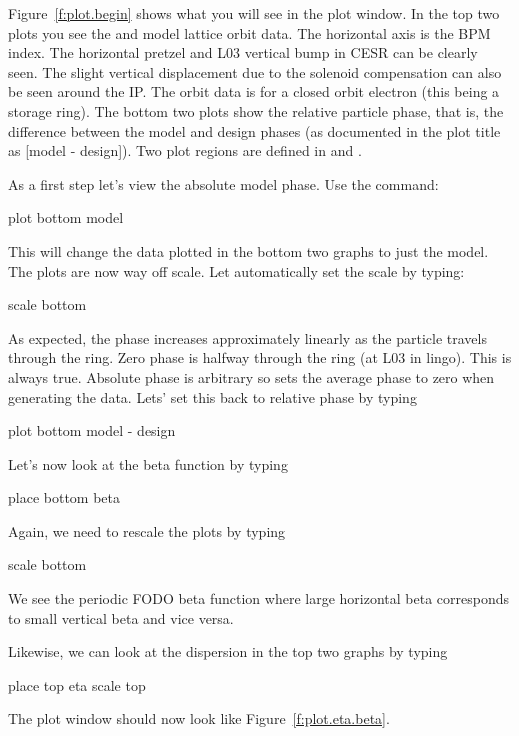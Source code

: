 Figure~\ref{f:plot.begin} shows what you will see in the plot
window. In the top two plots you see the  and  model
lattice orbit data. The horizontal axis is the \cesr BPM index. The
horizontal pretzel and L03 vertical bump in CESR can be clearly
seen. The slight vertical displacement due to the solenoid
compensation can also be seen around the IP. The orbit data is for a
closed orbit electron (this being a storage ring). The bottom two
plots show the relative particle phase, that is, the difference
between the model and design phases (as documented in the plot title
as [model - design]). Two plot regions are defined in \tao
{} and .

As a first step let's view the absolute model phase. Use the command:
\begin{example}
  plot bottom model
\end{example}
This will change the data plotted in the bottom two graphs to just the
model.  The plots are now way off scale. Let \tao automatically set
the scale by typing:
\begin{example}
  scale bottom
\end{example}
As expected, the phase increases approximately linearly as the
particle travels through the ring. Zero phase is halfway through the
ring (at L03 in \cesr lingo).  This is always true. Absolute phase is
arbitrary so \tao sets the average phase to zero when generating the
data. Lets' set this back to relative phase by typing
\begin{example}
  plot bottom model - design
\end{example}

Let's now look at the beta function by typing
\begin{example}
  place bottom beta
\end{example}
Again, we need to rescale the plots by typing
\begin{example}
  scale bottom
\end{example}
We see the periodic FODO beta function where large horizontal beta
corresponds to small vertical beta and vice versa.

Likewise, we can look at the dispersion in the top two graphs by
typing
\begin{example}
  place top eta
  scale top
\end{example}
The plot window should now look like Figure~\ref{f:plot.eta.beta}.

